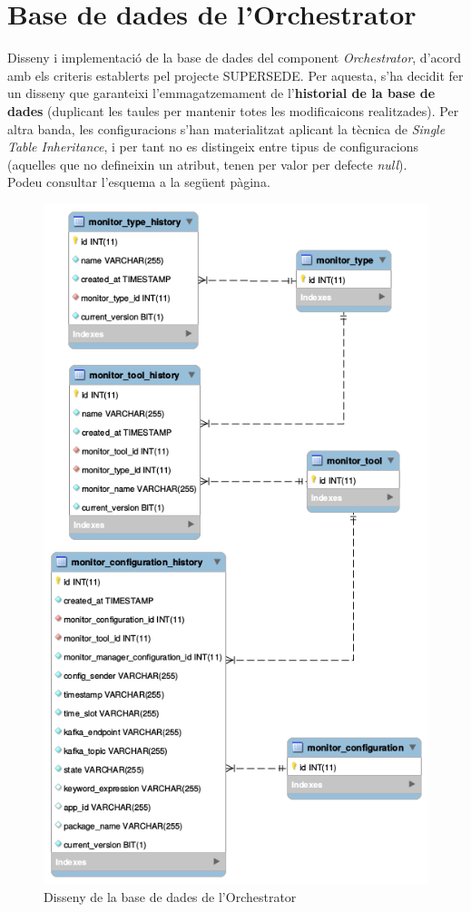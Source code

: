 
\chapter{Base de dades de l'Orchestrator} %

\label{OrchestratorDB} %

Disseny i implementació de la base de dades del component \textit{Orchestrator}, d'acord amb els criteris establerts pel projecte SUPERSEDE. Per aquesta, s'ha decidit fer un disseny que garanteixi l'emmagatzemament de l'\textbf{historial de la base de dades} (duplicant les taules per mantenir totes les modificaicons realitzades). Per altra banda, les configuracions s'han materialitzat aplicant la tècnica de \textit{Single Table Inheritance}, i per tant no es distingeix entre tipus de configuracions (aquelles que no defineixin un atribut, tenen per valor per defecte \textit{null}).\\

Podeu consultar l'esquema a la següent pàgina.

\begin{figure}[!h]
\centering
\includegraphics[width=12cm]{Figures/orchestratordb}
\decoRule
\caption{Disseny de la base de dades de l'Orchestrator}
\label{fig:orchestratordb}
\end{figure}
